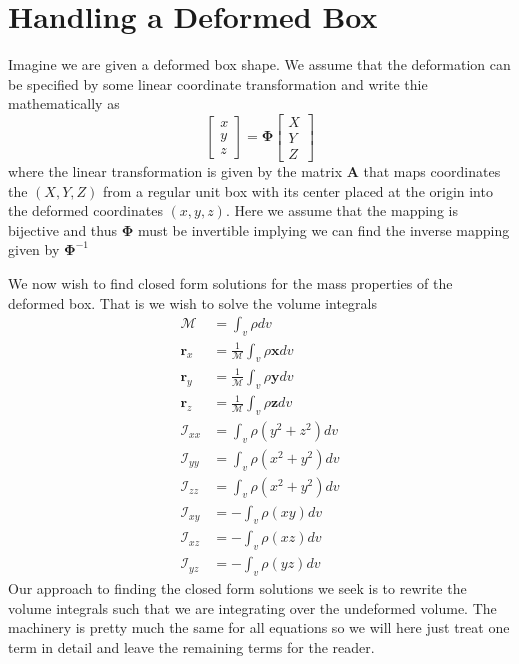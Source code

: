 \documentclass[twocolumn]{article}
\renewcommand{\vec}[1]{ \ensuremath{\mathbf{#1} } }
\newcommand{\mat}[1]{\ensuremath{\mathbf{#1} }}
\newcommand{\inertia}{\ensuremath{\mathcal{I} }}
\newcommand{\mass}{\ensuremath{\mathcal{M} }}
\begin{document}
\section*{Handling a Deformed Box}\label{sec:handl-deform-box}
Imagine we are given a deformed box shape. We assume that the deformation can be
specified by some linear coordinate transformation and write thie mathematically
as
\begin{equation*}
  \begin{bmatrix}
    x\\
    y\\
    z
  \end{bmatrix}
  =
  \mat \Phi
  \begin{bmatrix}
    X\\
    Y\\
    Z
  \end{bmatrix}
\end{equation*}
where the linear transformation is given by the matrix $\mat A$ that maps
coordinates the $(X, Y, Z)$ from a regular unit box with its center placed at
the origin into the deformed coordinates $(x, y, z)$. Here we assume that the
mapping is bijective and thus $\mat  \Phi$ must be invertible implying we
can find the inverse mapping given by $\mat \Phi^{-1}$

We now wish to find closed form solutions for the mass properties of the
deformed box. That is we wish to solve the volume integrals
\begin{subequations}
  \begin{align*}
    \mass &= \int_v  \rho   dv \\
    \vec r_x &= \frac{1}{\mass}\int_v  \rho \vec x  dv \\
    \vec r_y &= \frac{1}{\mass}\int_v  \rho \vec y  dv \\
    \vec r_z &= \frac{1}{\mass}\int_v  \rho \vec z  dv \\
    \inertia_{xx} &= \int_v  \rho \left( y^2 + z^2 \right)  dv \\
    \inertia_{yy} &= \int_v  \rho \left( x^2 + y^2 \right)  dv \\
    \inertia_{zz} &= \int_v  \rho \left( x^2 + y^2 \right)  dv \\
    \inertia_{xy} &= - \int_v  \rho \left( x y \right)  dv \\
    \inertia_{xz} &= - \int_v  \rho \left( x z\right)  dv \\
    \inertia_{yz} &= - \int_v  \rho \left( y z \right)  dv
  \end{align*}
\end{subequations}
Our approach to finding the closed form solutions we seek is to rewrite the
volume integrals such that we are integrating over the undeformed volume. The
machinery is pretty much the same for all equations so we will here just treat
one term in detail and leave the remaining terms for the reader.
\end{document}
